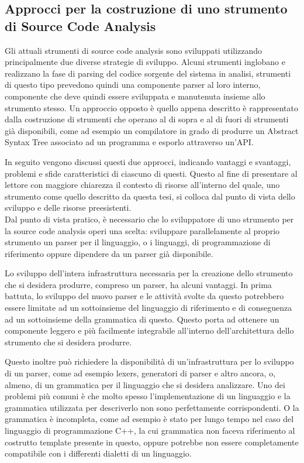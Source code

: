\subsection{Approcci per la costruzione di uno strumento di Source Code
Analysis}
\label{sca-approches}

Gli attuali strumenti di source code analysis sono sviluppati utilizzando
principalmente due diverse strategie di sviluppo. Alcuni strumenti inglobano e
realizzano la fase di parsing del codice sorgente del sistema in analisi,
strumenti di questo tipo prevedono quindi una componente parser al loro
interno, componente che deve quindi essere sviluppata e manutenuta insieme allo
strumento stesso. Un approccio opposto è quello appena descritto è
rappresentato dalla costruzione di strumenti che operano al di sopra e al di
fuori di strumenti già disponibili, come ad esempio un compilatore in grado di
produrre un Abstract Syntax Tree associato ad un programma e esporlo attraverso
un’API.

In seguito vengono discussi questi due approcci, indicando vantaggi e
svantaggi, problemi e sfide caratteristici di ciascuno di questi. Questo al
fine di presentare al lettore con maggiore chiarezza il contesto di risorse
all’interno del quale, uno strumento come quello descritto da questa tesi, si
colloca dal punto di vista dello sviluppo e delle risorse preesistenti.\\

Dal punto di vista pratico, è necessario che lo sviluppatore di uno strumento
per la source code analysis operi una scelta: sviluppare parallelamente al
proprio strumento un parser per il linguaggio, o i linguaggi, di programmazione
di riferimento oppure dipendere da un parser già disponibile.

Lo sviluppo dell’intera infrastruttura necessaria per la creazione dello
strumento che si desidera produrre, compreso un parser, ha alcuni vantaggi. In
prima battuta, lo sviluppo del nuovo parser e le attività svolte da questo
potrebbero essere limitate ad un sottoinsieme del linguaggio di riferimento e
di conseguenza ad un sottoinsieme della grammatica di questo. Questo porta ad
ottenere un componente leggero e più facilmente integrabile all'interno
dell'architettura dello strumento che si desidera produrre.

Questo inoltre può richiedere la disponibilità di un’infrastruttura per lo
sviluppo di un parser, come ad esempio lexers, generatori di parser e altro
ancora, o, almeno, di un grammatica per il linguaggio che si desidera
analizzare. Uno dei problemi più comuni è che molto spesso l’implementazione di
un linguaggio e la grammatica utilizzata per descriverlo non sono perfettamente
corrispondenti. O la grammatica è incompleta, come ad esempio è stato per lungo
tempo nel caso del linguaggio di programmazione C++, la cui grammatica non
faceva riferimento al costrutto template presente in questo, oppure potrebbe
non essere completamente compatibile con i differenti dialetti di un
linguaggio.

